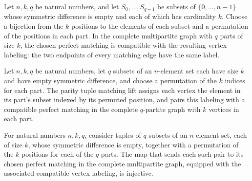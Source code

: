 \begin{theorem}
\label{FABL.LevelKParityTuple.chosenCompatibleMatching_spec}
\leanok
{}
Let $n,k,q$ be natural numbers, and let $S_0,\ldots,S_{q-1}$ be subsets of
$\{0,\ldots,n-1\}$ whose symmetric difference is empty and each of which has cardinality
$k$. Choose a bijection from the $k$ positions to the elements of each subset and a
permutation of the positions in each part. In the complete multipartite graph with $q$
parts of size $k$, the chosen perfect matching is compatible with the resulting vertex
labeling: the two endpoints of every matching edge have the same label.
\end{theorem}

\begin{definition}
\label{FABL.parityTupleMatchingLift}
\leanok
{}
Let $n,k,q$ be natural numbers, let $q$ subsets of an $n$-element set each have size $k$
and have empty symmetric difference, and choose a permutation of the $k$ indices for
each part. The parity tuple matching lift assigns each vertex the element in its part’s
subset indexed by its permuted position, and pairs this labeling with a compatible
perfect matching in the complete $q$-partite graph with $k$ vertices in each part.
\end{definition}

\begin{theorem}
\label{FABL.parityTupleMatchingLift_injective}
\leanok
{}
For natural numbers $n,k,q$, consider tuples of $q$ subsets of an $n$-element set, each
of size $k$, whose symmetric difference is empty, together with a permutation of the $k$
positions for each of the $q$ parts. The map that sends each such pair to its chosen
perfect matching in the complete multipartite graph, equipped with the associated
compatible vertex labeling, is injective.
\end{theorem}

